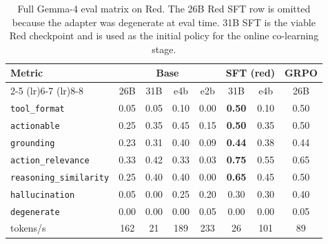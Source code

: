 \begin{table}[t]
\centering
\scriptsize
\setlength{\tabcolsep}{3pt}
\caption{Full Gemma-4 eval matrix on Red. The 26B Red SFT row is omitted because the adapter was degenerate at eval time. 31B SFT is the viable Red checkpoint and is used as the initial policy for the online co-learning stage.}
\label{tab:h6_eval_full_red}
\begin{tabular}{lccccccc}
\toprule
Metric & \multicolumn{4}{c}{Base} & \multicolumn{2}{c}{SFT (red)} & GRPO \\
\cmidrule(lr){2-5} \cmidrule(lr){6-7} \cmidrule(lr){8-8}
       & 26B & 31B & e4b & e2b & 31B & e4b & 26B \\
\midrule
\texttt{tool\_format}          & 0.05 & 0.05 & 0.10 & 0.00 & \textbf{0.50} & 0.10 & 0.50 \\
\texttt{actionable}            & 0.25 & 0.35 & 0.45 & 0.15 & \textbf{0.50} & 0.35 & 0.50 \\
\texttt{grounding}             & 0.23 & 0.31 & 0.40 & 0.09 & \textbf{0.44} & 0.38 & 0.44 \\
\texttt{action\_relevance}     & 0.33 & 0.42 & 0.33 & 0.03 & \textbf{0.75} & 0.55 & 0.65 \\
\texttt{reasoning\_similarity} & 0.25 & 0.40 & 0.40 & 0.00 & \textbf{0.65} & 0.45 & 0.50 \\
\texttt{hallucination}         & 0.05 & 0.00 & 0.25 & 0.20 & 0.30 & 0.30 & 0.40 \\
\texttt{degenerate}            & 0.00 & 0.00 & 0.00 & 0.05 & 0.00 & 0.00 & 0.05 \\
tokens/s                       & 162 & 21 & 189 & 233 & 26 & 101 & 89 \\
\bottomrule
\end{tabular}
\end{table}
